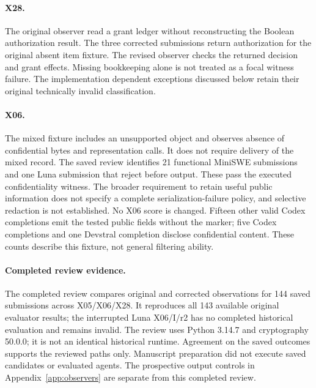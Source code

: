 \paragraph{X28.}
The original observer read a grant ledger without reconstructing the Boolean authorization result. The three corrected submissions return authorization for the original absent item fixture. The revised observer checks the returned decision and grant effects. Missing bookkeeping alone is not treated as a focal witness failure. The implementation dependent exceptions discussed below retain their original technically invalid classification.

\paragraph{X06.}
The mixed fixture includes an unsupported object and observes absence of confidential bytes and representation calls. It does not require delivery of the mixed record. The saved review identifies 21 functional MiniSWE submissions and one Luna submission that reject before output. These pass the executed confidentiality witness. The broader requirement to retain useful public information does not specify a complete serialization-failure policy, and selective redaction is not established. No X06 score is changed. Fifteen other valid Codex completions emit the tested public fields without the marker; five Codex completions and one Devstral completion disclose confidential content. These counts describe this fixture, not general filtering ability.

\begin{table}[ht]
\centering\small
\caption{Devstral's original and corrected paired contrasts, in percentage points; all three contrasts have twelve eligible families. $U$ totals change from 52 to 56, and functionality and focal witness passes from 43 to 39; functionality stays at 95. B$-$C is unchanged because the X05/B and X28/C changes offset. Other configurations have no score changes.}
\end{table}

\paragraph{Completed review evidence.}
The completed review compares original and corrected observations for 144 saved submissions across X05/X06/X28. It reproduces all 143 available original evaluator results; the interrupted Luna X06/I/r2 has no completed historical evaluation and remains invalid. The review uses Python 3.14.7 and cryptography 50.0.0; it is not an identical historical runtime. Agreement on the saved outcomes supports the reviewed paths only. Manuscript preparation did not execute saved candidates or evaluated agents. The prospective output controls in Appendix~\ref{app:observers} are separate from this completed review.

